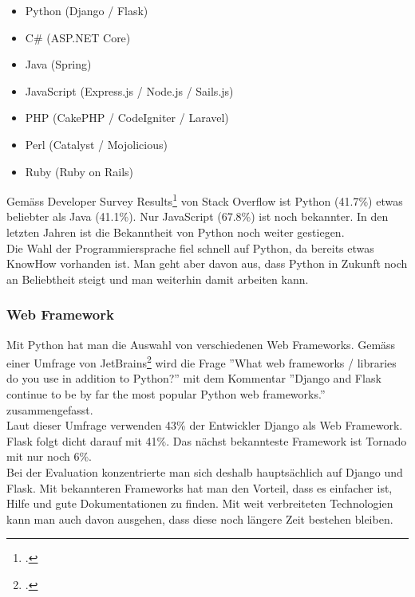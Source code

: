 
\begin{itemize}
	\item Python (Django / Flask)
	\item C\# (ASP.NET Core)
	\item Java (Spring)
	\item JavaScript (Express.js / Node.js / Sails.js)
	\item PHP (CakePHP / CodeIgniter / Laravel)
	\item Perl (Catalyst / Mojolicious)
	\item Ruby (Ruby on Rails)
\end{itemize}


Gemäss Developer Survey Results\footcite{developer_survey_results} von Stack Overflow ist Python (41.7\%) etwas beliebter als Java (41.1\%). Nur JavaScript (67.8\%) ist noch bekannter. In den letzten Jahren ist die Bekanntheit von Python noch weiter gestiegen. \\

Die Wahl der Programmiersprache fiel schnell auf Python, da bereits etwas KnowHow vorhanden ist. Man geht aber davon aus, dass Python in Zukunft noch an Beliebtheit steigt und man weiterhin damit arbeiten kann.


\subsubsection*{Web Framework}
Mit Python hat man die Auswahl von verschiedenen Web Frameworks. Gemäss einer Umfrage von JetBrains\footcite{python_survey_results} wird die Frage ''What web frameworks / libraries do you use in addition to Python?'' mit dem Kommentar ''Django and Flask continue to be by far the most popular Python web frameworks.'' zusammengefasst. \\
Laut dieser Umfrage verwenden 43\% der Entwickler  Django als Web Framework. Flask folgt dicht darauf mit 41\%. Das nächst bekannteste Framework ist Tornado mit nur noch 6\%. \\
Bei der Evaluation konzentrierte man sich deshalb hauptsächlich auf Django und Flask. Mit bekannteren Frameworks hat man den Vorteil, dass es einfacher ist, Hilfe und gute Dokumentationen zu finden. Mit weit verbreiteten Technologien kann man auch davon ausgehen, dass diese noch längere Zeit bestehen bleiben.  \\ 

